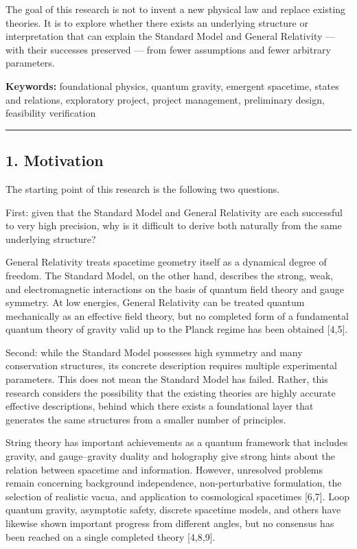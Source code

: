 \documentclass[
  a4paper,
]{article}
\begin{document}
The goal of this research is not to invent a new physical law and
replace existing theories. It is to explore whether there exists an
underlying structure or interpretation that can explain the Standard
Model and General Relativity --- with their successes preserved --- from
fewer assumptions and fewer arbitrary parameters.

\textbf{Keywords:} foundational physics, quantum gravity, emergent
spacetime, states and relations, exploratory project, project
management, preliminary design, feasibility verification

\begin{center}\rule{0.5\linewidth}{0.5pt}\end{center}

\subsection{1. Motivation}\label{motivation}

The starting point of this research is the following two questions.

First: given that the Standard Model and General Relativity are each
successful to very high precision, why is it difficult to derive both
naturally from the same underlying structure?

General Relativity treats spacetime geometry itself as a dynamical
degree of freedom. The Standard Model, on the other hand, describes the
strong, weak, and electromagnetic interactions on the basis of quantum
field theory and gauge symmetry. At low energies, General Relativity can
be treated quantum mechanically as an effective field theory, but no
completed form of a fundamental quantum theory of gravity valid up to
the Planck regime has been obtained {[}4,5{]}.

Second: while the Standard Model possesses high symmetry and many
conservation structures, its concrete description requires multiple
experimental parameters. This does not mean the Standard Model has
failed. Rather, this research considers the possibility that the
existing theories are highly accurate effective descriptions, behind
which there exists a foundational layer that generates the same
structures from a smaller number of principles.

String theory has important achievements as a quantum framework that
includes gravity, and gauge--gravity duality and holography give strong
hints about the relation between spacetime and information. However,
unresolved problems remain concerning background independence,
non-perturbative formulation, the selection of realistic vacua, and
application to cosmological spacetimes {[}6,7{]}. Loop quantum gravity,
asymptotic safety, discrete spacetime models, and others have likewise
shown important progress from different angles, but no consensus has
been reached on a single completed theory {[}4,8,9{]}.
\end{document}
